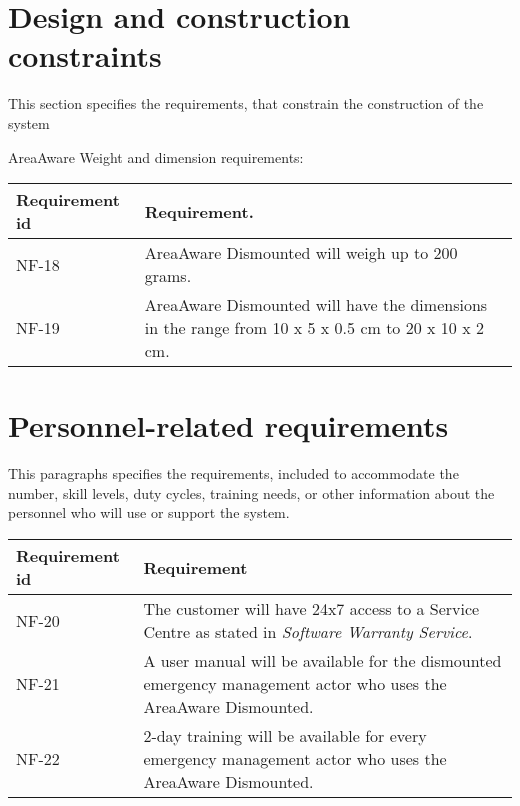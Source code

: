 \label{sec_nonFunc5}
\section{Design and construction constraints}
This section specifies the requirements, that constrain the construction of the system

AreaAware Weight and dimension requirements:
\begin{longtable}{| p{3.2cm} |  p{10cm} | }
	\hline
	\textbf{Requirement id} &  \textbf{Requirement}. \\
	\hline
	NF-18 & AreaAware Dismounted will weigh up to 200 grams.  \\
	\hline
	NF-19 & AreaAware Dismounted will have the dimensions in the range from 10 x 5 x 0.5 cm to 20 x 10 x 2 cm.  \\
	\hline
\end{longtable}

\label{sec_nonFunc6}
\section{Personnel-related requirements}
This paragraphs specifies the requirements, included to accommodate the number, skill levels, duty cycles, training needs, or other information about the personnel who will use or support the system.


\begin{longtable}{| p{3.2cm} |  p{10cm} | }
	\hline
	\textbf{Requirement id} &  \textbf{Requirement } \\
	\hline
	NF-20 & The customer will have 24x7 access to a Service Centre as stated in \emph{Software Warranty Service}.  \\
	\hline
	NF-21 & A user manual will be available for the dismounted emergency management actor who uses the AreaAware Dismounted. \\
	\hline
	NF-22 & 2-day training will be available for every emergency management actor who uses the AreaAware Dismounted. \\
	\hline
\end{longtable}



